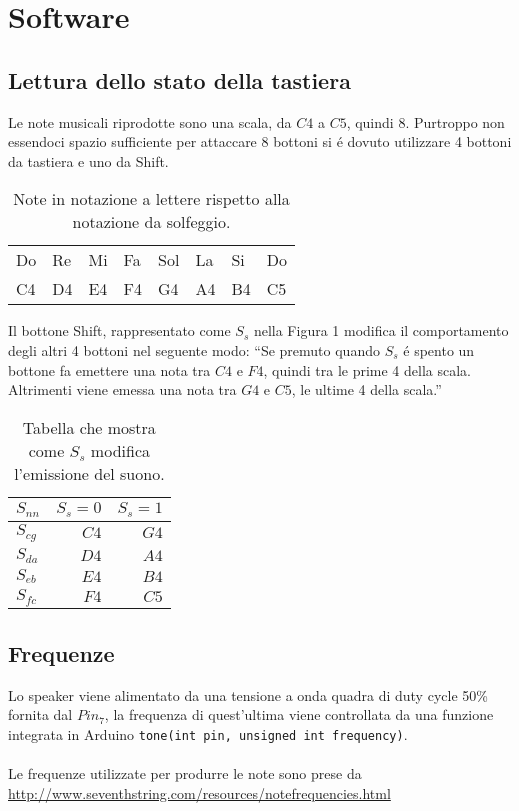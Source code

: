 \documentclass[a4paper]{article}
\begin{document}
	\section{Software}
		\subsection{Lettura dello stato della tastiera}
			Le note musicali riprodotte sono una scala, da $C4$ a $C5$, quindi 8.
			Purtroppo non essendoci spazio sufficiente per attaccare 8 bottoni si é dovuto
			utilizzare 4 bottoni da tastiera e uno da Shift.
			
			\begin{table}[H]
				\centering \begin{tabular}{ | l l l l l l l l | }
				\hline
				Do & Re & Mi & Fa & Sol & La & Si & Do \\
				C4 & D4 & E4 & F4 & G4 & A4 & B4 & C5	\\
				\hline
				\end{tabular}
				\caption{Note in notazione a lettere rispetto alla notazione da solfeggio.}
			\end{table}
			
			Il bottone Shift, rappresentato come $S_s$ nella Figura 1 modifica il comportamento
			degli altri 4 bottoni nel seguente modo:
			``Se premuto quando $S_s$ é spento un bottone fa emettere una nota tra $C4$ e $F4$,
			quindi tra le prime 4 della scala. Altrimenti viene emessa una nota tra $G4$ e $C5$,
			le ultime 4 della scala.''
			
			\begin{table}[h]
				\begin{center} \begin{tabular}{ | l | r r | }
					\hline
					$S_{nn}$		&		$S_s = 0$	&	$S_s = 1$ \\
					\hline
					$S_{cg}$	&	$C4$	&	$G4$	\\
					$S_{da}$	&	$D4$	&	$A4$	\\
					$S_{eb}$	&	$E4$	&	$B4$	\\
					$S_{fc}$	&	$F4$	&	$C5$	\\
					\hline
				\end{tabular} \end{center}
				\caption{Tabella che mostra come $S_s$ modifica l'emissione del suono.}
			\end{table}

		\subsection{Frequenze}
			Lo speaker viene alimentato da una tensione a onda quadra di duty cycle 50\% fornita
			dal $Pin_7$, la frequenza di quest'ultima viene controllata da una funzione integrata in Arduino
			\texttt{tone(int pin, unsigned int frequency)}.\\\\
			Le frequenze utilizzate per produrre le note sono prese da \\
			\url{http://www.seventhstring.com/resources/notefrequencies.html}
			
\end{document}
